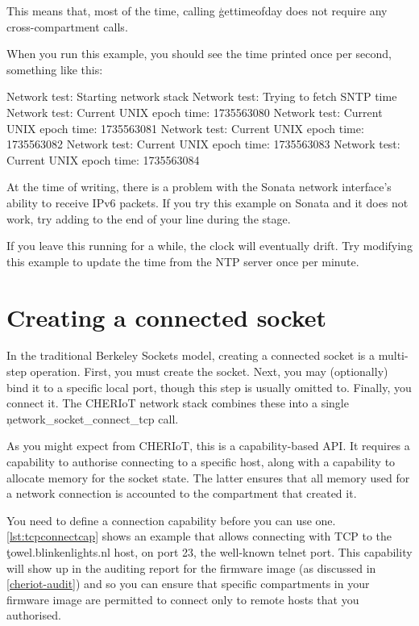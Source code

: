 This means that, most of the time, calling \c{gettimeofday} does not require any cross-compartment calls.

When you run this example, you should see the time printed once per second, something like this:

\begin{console}
Network test: Starting network stack
Network test: Trying to fetch SNTP time
Network test: Current UNIX epoch time: 1735563080
Network test: Current UNIX epoch time: 1735563081
Network test: Current UNIX epoch time: 1735563082
Network test: Current UNIX epoch time: 1735563083
Network test: Current UNIX epoch time: 1735563084
\end{console}

\begin{note}
At the time of writing, there is a problem with the Sonata network interface's ability to receive IPv6 packets.
If you try this example on Sonata and it does not work, try adding  to the end of your  line during the  stage.
\end{note}

If you leave this running for a while, the clock will eventually drift.
Try modifying this example to update the time from the NTP server once per minute.

\section{Creating a connected socket}

In the traditional Berkeley Sockets model, creating a connected socket is a multi-step operation.
First, you must create the socket.
Next, you may (optionally) bind it to a specific local port, though this step is usually omitted to.
Finally, you connect it.
The CHERIoT network stack combines these into a single \c{network_socket_connect_tcp} call.


As you might expect from CHERIoT, this is a capability-based API.
It requires a capability to authorise connecting to a specific host, along with a capability to allocate memory for the socket state.
The latter ensures that all memory used for a network connection is accounted to the compartment that created it.

You need to define a connection capability before you can use one.
\ref{lst:tcpconnectcap} shows an example that allows connecting with TCP to the \c{towel.blinkenlights.nl} host, on port 23, the well-known telnet port.
This capability will show up in the auditing report for the firmware image (as discussed in \ref{cheriot-audit}) and so you can ensure that specific compartments in your firmware image are permitted to connect only to remote hosts that you authorised.

